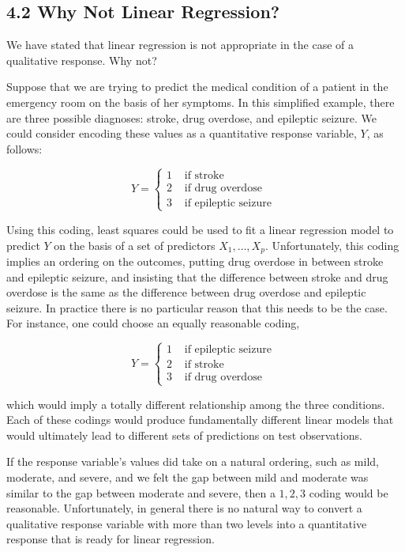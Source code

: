 \documentclass[10pt]{article}
\begin{document}
\subsection*{4.2 Why Not Linear Regression?}
We have stated that linear regression is not appropriate in the case of a qualitative response. Why not?

Suppose that we are trying to predict the medical condition of a patient in the emergency room on the basis of her symptoms. In this simplified example, there are three possible diagnoses: stroke, drug overdose, and epileptic seizure. We could consider encoding these values as a quantitative response variable, $Y$, as follows:

$$
Y= \begin{cases}1 & \text { if stroke } \\ 2 & \text { if drug overdose } \\ 3 & \text { if epileptic seizure }\end{cases}
$$

Using this coding, least squares could be used to fit a linear regression model to predict $Y$ on the basis of a set of predictors $X_{1}, \ldots, X_{p}$. Unfortunately, this coding implies an ordering on the outcomes, putting drug overdose in between stroke and epileptic seizure, and insisting that the difference between stroke and drug overdose is the same as the difference between drug overdose and epileptic seizure. In practice there is no particular reason that this needs to be the case. For instance, one could choose an equally reasonable coding,

$$
Y= \begin{cases}1 & \text { if epileptic seizure } \\ 2 & \text { if stroke } \\ 3 & \text { if drug overdose }\end{cases}
$$

which would imply a totally different relationship among the three conditions. Each of these codings would produce fundamentally different linear models that would ultimately lead to different sets of predictions on test observations.

If the response variable's values did take on a natural ordering, such as mild, moderate, and severe, and we felt the gap between mild and moderate was similar to the gap between moderate and severe, then a $1,2,3$ coding would be reasonable. Unfortunately, in general there is no natural way to convert a qualitative response variable with more than two levels into a quantitative response that is ready for linear regression.
\end{document}
